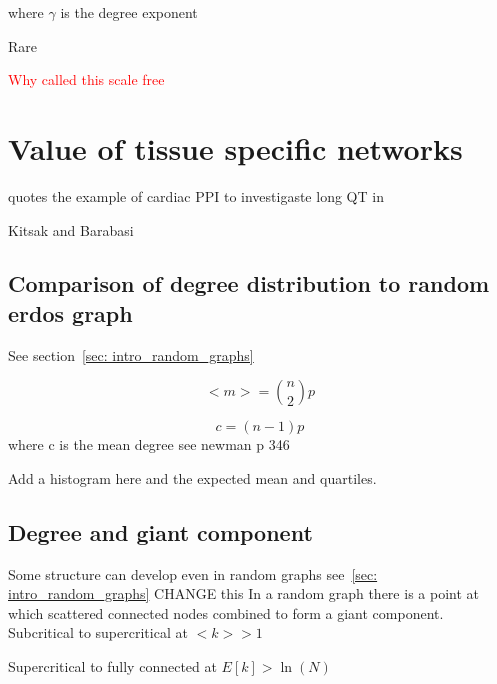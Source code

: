 where $\gamma$ is the degree exponent \cite{barabasi2016network}

Rare \cite{broido2019scale}

\textcolor{red}{Why called this scale free}




\section{Value of tissue specific networks}
\cite{parikshak2015systems} quotes the example of cardiac PPI to investigaste long QT in \cite{lundby2014annotation}

Kitsak and Barabasi \cite{kitsak2016tissue}

\subsection{Comparison of degree distribution to random erdos graph}
See section~\ref{sec: intro_random_graphs}

\begin{equation}
    <m> = \binom{n}{2}p
\end{equation}


\begin{equation}
    c = (n-1)p
\end{equation}
where c is the mean degree see newman p 346

Add a histogram here and the expected mean and quartiles.


\subsection{Degree and giant component}
\label{sec:connected component and degree}
Some structure can develop even in random graphs see~\ref{sec: intro_random_graphs}
 CHANGE this
In a random graph there is a point at which scattered connected nodes combined to form a giant component. Subcritical to supercritical at $<k> >1$


Supercritical to fully connected at $E[k] > \ln(N)$


